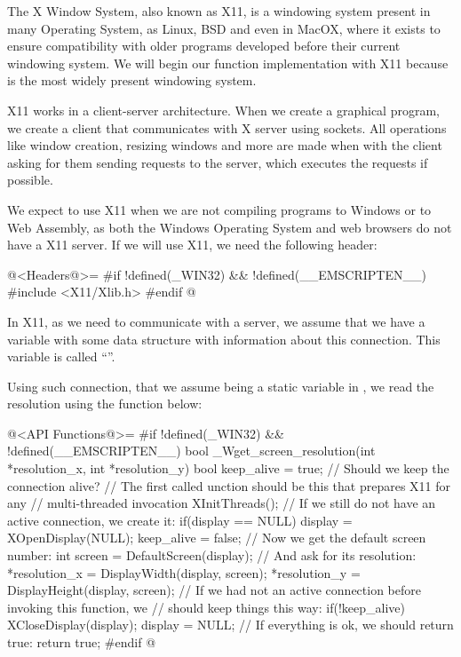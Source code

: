 
The X Window System, also known as X11, is a windowing system present
in many Operating System, as Linux, BSD and even in MacOX, where it
exists to ensure compatibility with older programs developed before
their current windowing system. We will begin our function
implementation with X11 because is the most widely present windowing
system.

X11 works in a client-server architecture. When we create a graphical
program, we create a client that communicates with X server using
sockets. All operations like window creation, resizing windows and
more are made when with the client asking for them sending requests to
the server, which executes the requests if possible.

We expect to use X11 when we are not compiling programs to Windows or
to Web Assembly, as both the Windows Operating System and web browsers
do not have a X11 server. If we will use X11, we need the following
header:

\iniciocodigo
@<Headers@>=
#if !defined(_WIN32) && !defined(__EMSCRIPTEN__)
#include <X11/Xlib.h>
#endif
@
\fimcodigo

In X11, as we need to communicate with a server, we assume that we
have a variable with some data structure with information about this
connection. This variable is called ``''.

Using such connection, that we assume being a static variable
in , we read the resolution using the function
below:

\iniciocodigo
@<API Functions@>=
#if !defined(_WIN32) && !defined(__EMSCRIPTEN__)
bool _Wget_screen_resolution(int *resolution_x, int *resolution_y){
  bool keep_alive = true; // Should we keep the connection alive?
  // The first called unction should be this that prepares X11 for any
  // multi-threaded invocation
  XInitThreads();
  // If we still do not have an active connection, we create it:
  if(display == NULL){
    display = XOpenDisplay(NULL);
    keep_alive = false;
  }
  // Now we get the default screen number:
  int screen = DefaultScreen(display);
  // And ask for its resolution:
  *resolution_x = DisplayWidth(display, screen);
  *resolution_y = DisplayHeight(display, screen);
  // If we had not an active connection before invoking this function, we
  // should keep things this way:
  if(!keep_alive){
    XCloseDisplay(display);
    display = NULL;
  }
  // If everything is ok, we should return true:
  return true;
}
#endif
@
\fimcodigo

